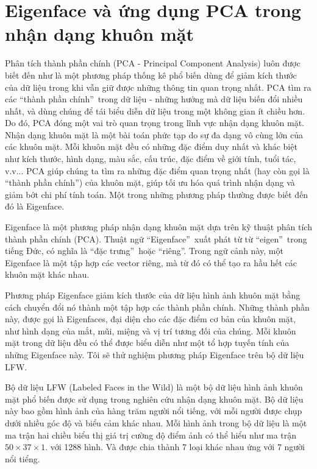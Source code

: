 \documentclass[12pt,a4paper,oneside]{report}
\numberwithin{equation}{section}
\begin{document}
\section{Eigenface và ứng dụng PCA trong nhận dạng khuôn mặt}
Phân tích thành phần chính (PCA - Principal Component Analysis) luôn được biết đến như là một phương pháp thống kê phổ biến dùng để giảm kích thước của dữ liệu trong khi vẫn giữ được những thông tin quan trọng nhất. PCA tìm ra các \textquotedblleft thành phần chính\textquotedblright\  trong dữ liệu - những hướng mà dữ liệu biến đổi nhiều nhất, và dùng chúng để tái biểu diễn dữ liệu trong một không gian ít chiều hơn. Do đó, PCA đóng một vai trò quan trọng trong lĩnh vực nhận dạng khuôn mặt. Nhận dạng khuôn mặt là một bài toán phức tạp do sự đa dạng vô cùng lớn của các khuôn mặt. Mỗi khuôn mặt đều có những đặc điểm duy nhất và khác biệt như kích thước, hình dạng, màu sắc, cấu trúc, đặc điểm về giới tính, tuổi tác, v.v... PCA giúp chúng ta tìm ra những đặc điểm quan trọng nhất (hay còn gọi là \textquotedblleft thành phần chính\textquotedblright) của khuôn mặt, giúp tối ưu hóa quá trình nhận dạng và giảm bớt chi phí tính toán. Một trong những phương pháp thường được biết đến đó là Eigenface.

Eigenface là một phương pháp nhận dạng khuôn mặt dựa trên kỹ thuật phân tích thành phần chính (PCA). Thuật ngữ \textquotedblleft Eigenface\textquotedblright\ xuất phát từ từ \textquotedblleft eigen\textquotedblright\ trong tiếng Đức, có nghĩa là \textquotedblleft đặc trưng\textquotedblright\ hoặc  \textquotedblleft riêng\textquotedblright. Trong ngữ cảnh này, một Eigenface là một tập hợp các vector riêng, mà từ đó có thể tạo ra hầu hết các khuôn mặt khác nhau.

Phương pháp Eigenface giảm kích thước của dữ liệu hình ảnh khuôn mặt bằng cách chuyển đổi nó thành một tập hợp các thành phần chính. Những thành phần này, được gọi là Eigenfaces, đại diện cho các đặc điểm cơ bản của khuôn mặt, như hình dạng của mắt, mũi, miệng và vị trí tương đối của chúng. Mỗi khuôn mặt trong dữ liệu đều có thể được biểu diễn như một tổ hợp tuyến tính của những Eigenface này. Tôi sẽ thử nghiệm phương pháp Eigenface trên bộ dữ liệu LFW.

Bộ dữ liệu LFW (Labeled Faces in the Wild)\cite{huang} là một bộ dữ liệu hình ảnh khuôn mặt phổ biến được sử dụng trong nghiên cứu nhận dạng khuôn mặt. Bộ dữ liệu này bao gồm hình ảnh của hàng trăm người nổi tiếng, với mỗi người được chụp dưới nhiều góc độ và biểu cảm khác nhau. Mỗi hình ảnh trong bộ dữ liệu là một ma trận hai chiều biểu thị giá trị cường độ điểm ảnh có thể hiểu như ma trận $50\times37\times1$. với 1288 hình. Và được chia thành 7 loại khác nhau ứng với 7 người nổi tiểng.
\end{document}
